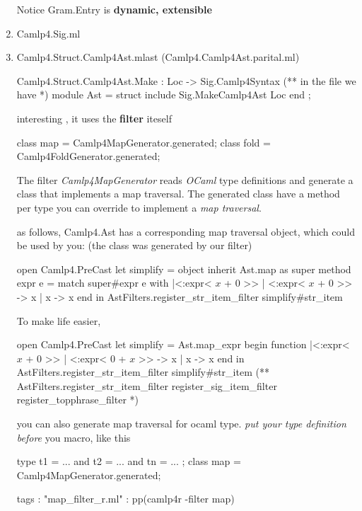 \begin{enumerate}
    Notice Gram.Entry is \textbf{ dynamic, extensible}
  \item Camlp4.Sig.ml
  \item Camlp4.Struct.Camlp4Ast.mlast (Camlp4.Camlp4Ast.parital.ml)
    

\begin{bluecode}
Camlp4.Struct.Camlp4Ast.Make : Loc -> Sig.Camlp4Syntax
(** in the file we have *)
  module Ast = struct
     include Sig.MakeCamlp4Ast Loc 
  end ;
\end{bluecode}

interesting , it uses the \textbf{ filter} iteself 

\begin{bluecode}
class map = Camlp4MapGenerator.generated;
class fold = Camlp4FoldGenerator.generated;
\end{bluecode}


  The filter \emph{Camlp4MapGenerator} reads \emph{OCaml} type definitions and generate
a class that implements a map traversal.
The generated class have a method per type you can override to
implement a \emph{map traversal}.

as follows, Camlp4.Ast has a corresponding map traversal object, which could
be used by you: (the class was generated by our filter)
\begin{bluecode}
open Camlp4.PreCast 
let simplify = object
  inherit Ast.map as super
  method expr e = match super#expr e with
   |<:expr< $x$ + 0 >> | <:expr< $x$ + 0 >> ->  x
   | x -> x
end in AstFilters.register_str_item_filter simplify#str_item
\end{bluecode}

To make life easier,
\begin{bluecode}
open Camlp4.PreCast
let simplify = Ast.map_expr begin function
  |<:expr< $x$ + 0 >> | <:expr< 0 + $x$ >> -> x
  | x -> x 
end in AstFilters.register_str_item_filter simplify#str_item
(**
AstFilters.register_str_item_filter
register_sig_item_filter
register_topphrase_filter 
*)
\end{bluecode}


you can also generate map traversal for ocaml type. \emph{put your type definition before}
you macro, like this
\begin{bluecode}
type t1 = ...
and t2 = ...
and tn = ... ;
class map = Camlp4MapGenerator.generated;
\end{bluecode}
\begin{bluecode}
tags : "map_filter_r.ml" : pp(camlp4r -filter map)
\end{bluecode}


\end{enumerate}
